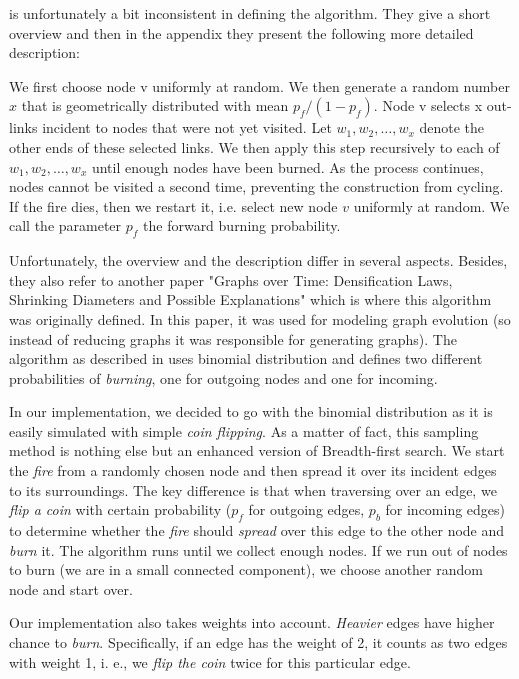 \cite{leskovec2006sampling} is unfortunately a bit inconsistent in defining the algorithm. They give a short overview and then in the appendix they present the following more detailed description:

\begin{displayquote}
We first choose node v uniformly at random. We then generate a random number $x$ that is geometrically distributed with mean $p_f/(1-p_f)$. Node v selects x out-links incident to nodes that were not yet visited. Let $w_1 , w_2 , \ldots, w_x$ denote the other ends of these selected links. We then apply this step recursively to each of $w_1, w_2, \ldots, w_x$ until enough nodes have been burned. As the process continues, nodes cannot be visited a second time, preventing the construction from cycling. If the fire dies, then we restart it, i.e. select new node $v$ uniformly at random. We call the parameter $p_f$ the forward burning probability.
\end{displayquote}

Unfortunately, the overview and the description differ in several aspects. Besides, they also refer to another paper "Graphs over Time: Densification Laws, Shrinking Diameters and Possible Explanations" \cite{leskovec2005graphs} which is where this algorithm was originally defined. In this paper, it was used for modeling graph evolution (so instead of reducing graphs it was responsible for generating graphs). The algorithm as described in \cite{leskovec2005graphs} uses binomial distribution and defines two different probabilities of \emph{burning}, one for outgoing nodes and one for incoming.

In our implementation, we decided to go with the binomial distribution as it is easily simulated with simple \emph{coin flipping}. As a matter of fact, this sampling method is nothing else but an enhanced version of Breadth-first search. We start the \emph{fire} from a randomly chosen node and then spread it over its incident edges to its surroundings. The key difference is that when traversing over an edge, we \emph{flip a coin} with certain probability ($p_f$ for outgoing edges, $p_b$ for incoming edges) to determine whether the \emph{fire} should \emph{spread} over this edge to the other node and \emph{burn} it. The algorithm runs until we collect enough nodes. If we run out of nodes to burn (we are in a small connected component), we choose another random node and start over.

Our implementation also takes weights into account. \emph{Heavier} edges have higher chance to \emph{burn}. Specifically, if an edge has the weight of 2, it counts as two edges with weight 1, i. e., we \emph{flip the coin} twice for this particular edge.

